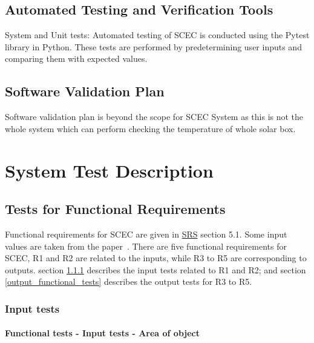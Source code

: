 \documentclass[12pt, titlepage]{article}
\begin{document}
\subsection{Automated Testing and Verification Tools}

System and Unit tests: Automated testing of SCEC is conducted using the Pytest library in Python. These tests are performed by predetermining user inputs and comparing them with expected values. 

\subsection{Software Validation Plan}

Software validation plan is beyond the scope for SCEC System as this is not the whole system which can perform checking the temperature of whole solar box.

\section{System Test Description}
\label{systemtests}
	
\subsection{Tests for Functional Requirements}

Functional requirements for SCEC are given in \href{https://github.com/DeeshaPatel/CAS-741-Solar-Cooker/blob/7c53c8d9a19ca2f94dfba6ba9208eae0bf03b8cc/docs/SRS/SRS.pdf}{SRS} section 5.1. Some input values are taken from the paper~\cite{MathsModel}. There are five functional requirements for SCEC, R1 and R2 are related to the inputs, while R3 to R5 are corresponding to outputs. section \ref{input_functional_tests} describes the input tests related to R1 and R2; and section \ref{output_functional_tests} describes the output tests for R3 to R5.        

\subsubsection{Input tests}
\label{input_functional_tests}

\paragraph{Functional tests - Input tests - Area of object}
\end{document}
